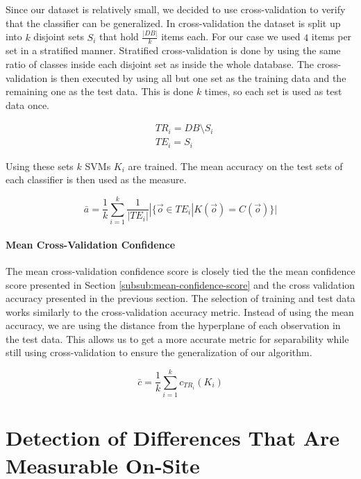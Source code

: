 \documentclass[pdftex,12pt,a4paper]{report}
\begin{document}
Since our dataset is relatively small, we decided to use cross-validation to verify that the classifier can be
generalized. In cross-validation the dataset is split up into $k$ disjoint sets $S_i$ that hold $\frac{|DB|}{k}$ items each. For our case we used $4$ items per set in a stratified manner. Stratified cross-validation is done by using the same ratio of classes inside each disjoint set as inside the whole database. The cross-validation is then
executed by using all but one set as the training data and the remaining one as the test data. This is done $k$ times, so each set is used as test data once.

\begin{equation}
\begin{split}
& TR_i = DB \setminus S_i \\
& TE_i = S_i 
\end{split}
\end{equation}

Using these sets $k$ SVMs $K_i$ are trained. The mean accuracy on the test sets of each classifier is then used
as the measure.

\begin{equation}
\bar{a} = \frac{1}{k} \sum_{i=1}^k \frac{1}{|TE_i|} | \{\vec{o} \in TE_i | K(\vec{o}) = C(\vec{o}) \}| 
\end{equation}

\subsubsection{Mean Cross-Validation Confidence}
\label{subsub:cross-validation-confidence}

The mean cross-validation confidence score is closely tied the the mean confidence score presented in Section \ref{subsub:mean-confidence-score} and the cross validation accuracy presented in the previous section. The selection of training and test data works similarly to the cross-validation accuracy metric. Instead of using the mean accuracy, we are using the distance from the hyperplane of each observation in the test data. This allows us to get a more accurate metric for separability while still using cross-validation to ensure the generalization of our algorithm.

\begin{equation}
\bar{c} = \frac{1}{k} \sum_{i=1}^k c_{TR_i}(K_i)
\end{equation}

\chapter{Detection of Differences That Are Measurable On-Site}
\label{chapter:measurable-differences}
\end{document}

